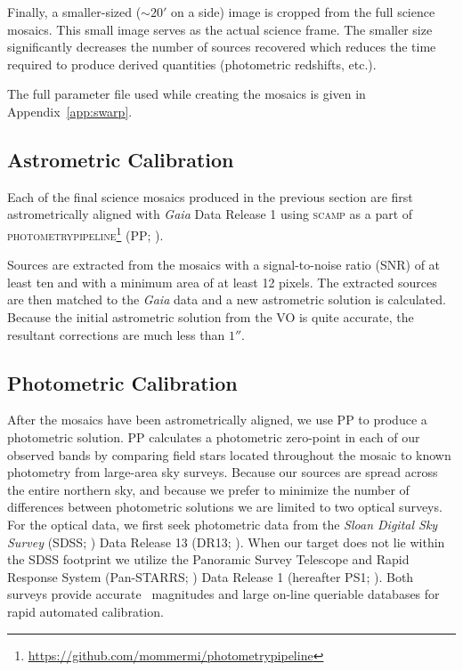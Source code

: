 \documentclass[apj, revtex4-1]{emulateapj}
\begin{document}
Finally, a smaller-sized ($\sim20'$ on a side) image is cropped from the full science mosaics. This small image serves as the actual science frame. The smaller size significantly decreases the number of sources recovered which reduces the time required to produce derived quantities (photometric redshifts, etc.).

The full parameter file used while creating the mosaics is given in Appendix~\ref{app:swarp}.

\subsection{Astrometric Calibration}
Each of the final science mosaics produced in the previous section are first astrometrically aligned with \textit{Gaia} \citep{GaiaCollaboration2016} Data Release 1 \citep{GaiaCollaboration2016a} using \textsc{scamp} \citep{Bertin2006} as a part of \textsc{photometrypipeline}\footnote{\url{https://github.com/mommermi/photometrypipeline}} (PP; \citealt{Mommert2017}).

Sources are extracted from the mosaics with a signal-to-noise ratio (SNR) of at least ten and with a minimum area of at least 12 pixels. The extracted sources are then matched to the \textit{Gaia} data and a new astrometric solution is calculated. Because the initial astrometric solution from the VO is quite accurate, the resultant corrections are much less than $1''$.

\subsection{Photometric Calibration}
After the mosaics have been astrometrically aligned, we use PP to produce a photometric solution. PP calculates a photometric zero-point in each of our observed bands by comparing field stars located throughout the mosaic to known photometry from large-area sky surveys. Because our sources are spread across the entire northern sky, and because we prefer to minimize the number of differences between photometric solutions we are limited to two optical surveys. For the optical data, we first seek photometric data from the \textit{Sloan Digital Sky Survey} (SDSS; \citealt{York2000}) Data Release 13 (DR13; \citealt{Albareti2017}). When our target does not lie within the SDSS footprint we utilize the Panoramic Survey Telescope and Rapid Response System (Pan-STARRS; \citealt{Chambers2016}) Data Release 1 (hereafter PS1; \citealt{Flewelling2016}). Both surveys provide accurate \sdssg\sdssr\sdssi\sdssz\ magnitudes and large on-line queriable databases for rapid automated calibration.
\end{document}
